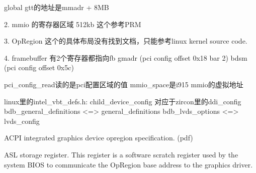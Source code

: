   global gtt的地址是mmadr + 8MB

2. mmio 的寄存器区域 512kb
  这个参考PRM

3. OpRegion
  这个的具体布局没有找到文档，只能参考linux kernel source code.

4. framebuffer
  有2个寄存器都指向fb
  gmadr (pci config offset 0x18 bar 2)
  bdsm (pci config offset 0x5c)

pci_config_read读的是pci配置区域的值
mmio_space是i915 mmio的虚拟地址


linux里的intel_vbt_defs.h: 
child_device_config 对应于zircon里的ddi_config
bdb_general_definitions <=> general_definitions
bdb_lvds_options <=> lvds_config


ACPI integrated graphics device opregion specification. (pdf)

ASL storage register. This register is a software scratch register used by the
system BIOS to communicate the OpRegion base address to the graphics driver.

